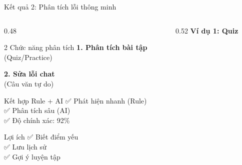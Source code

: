 \documentclass[notheorems,hyperref={bookmarks=true}]{beamer}
\begin{document}
\begin{frame}{Kết quả 2: Phân tích lỗi thông minh}
\begin{columns}
    \begin{column}{0.48\textwidth}
        \begin{exampleblock}{2 Chức năng phân tích}
            \textbf{1. Phân tích bài tập}\\
            {\footnotesize (Quiz/Practice)}
            
            \vspace{0.2cm}
            
            \textbf{2. Sửa lỗi chat}\\
            {\footnotesize (Câu văn tự do)}
        \end{exampleblock}
        
        \vspace{0.2cm}
        
        \begin{block}{Kết hợp Rule + AI}
            {\footnotesize
            ✅ Phát hiện nhanh (Rule)\\
            ✅ Phân tích sâu (AI)\\
            ✅ Độ chính xác: 92\%
            }
        \end{block}
        
        \vspace{0.2cm}
        
        \begin{alertblock}{Lợi ích}
            {\footnotesize
            ✅ Biết điểm yếu\\
            ✅ Lưu lịch sử\\
            ✅ Gợi ý luyện tập
            }
        \end{alertblock}
    \end{column}
    \begin{column}{0.52\textwidth}
        \centering
        \textbf{Ví dụ 1: Quiz}\\[0.15cm]
        
        \vspace{0.4cm}
        

\end{column}
\end{columns}
\end{frame}
\end{document}
